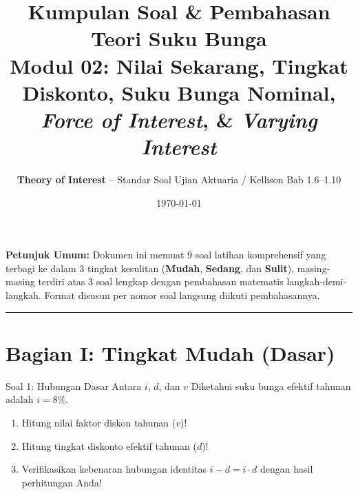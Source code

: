 \documentclass[11pt,a4paper]{article}
\title{\textbf{\LARGE Kumpulan Soal \& Pembahasan Teori Suku Bunga}\\[0.4em]
\Large Modul 02: Nilai Sekarang, Tingkat Diskonto, Suku Bunga Nominal, \textit{Force of Interest}, \& \textit{Varying Interest}}
\author{\textbf{Theory of Interest} -- Standar Soal Ujian Aktuaria / Kellison Bab 1.6--1.10}
\date{\today}
\begin{document}
\maketitle
\vspace{-0.5em}
\begin{center}
    \small \textbf{Petunjuk Umum:} Dokumen ini memuat 9 soal latihan komprehensif yang terbagi ke dalam 3 tingkat kesulitan (\textbf{Mudah}, \textbf{Sedang}, dan \textbf{Sulit}), masing-masing terdiri atas 3 soal lengkap dengan pembahasan matematis langkah-demi-langkah. Format disusun per nomor soal langsung diikuti pembahasannya.
\end{center}
\vspace{0.8em}
\hrule
\vspace{1.5em}

\section*{Bagian I: Tingkat Mudah (Dasar)}

\begin{problembox}{Soal 1: Hubungan Dasar Antara $i$, $d$, dan $v$}
Diketahui suku bunga efektif tahunan adalah $i = 8\%$.
\begin{enumerate}[label=(\alph*)]
    \item Hitung nilai faktor diskon tahunan ($v$)!
    \item Hitung tingkat diskonto efektif tahunan ($d$)!
    \item Verifikasikan kebenaran hubungan identitas $i - d = i \cdot d$ dengan hasil perhitungan Anda!
\end{enumerate}
\end{problembox}
\end{document}
